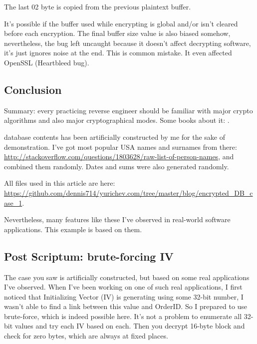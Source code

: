 The last 02 byte is copied from the previous plaintext buffer.

It's possible if the buffer used while encrypting is global and/or isn't cleared before
each encryption.
The final buffer size value is also biased somehow, nevertheless, the bug left uncaught
because it doesn't affect decrypting software, it's just ignores noise at the end.
This is common mistake.
It even affected OpenSSL (Heartbleed bug).

\subsection{Conclusion}

Summary:
every practicing reverse engineer should be familiar with major crypto algorithms and
also major cryptographical modes.
Some books about it: .

 database contents has been artificially constructed by me for the sake of demonstration.
I've got most popular USA names and surnames from there: \url{http://stackoverflow.com/questions/1803628/raw-list-of-person-names},
and combined them randomly.
Dates and sums were also generated randomly.

All files used in this article are here: \url{https://github.com/dennis714/yurichev.com/tree/master/blog/encrypted_DB_case_1}.

Nevertheless, many features like these I've observed in real-world software applications.
This example is based on them.

\subsection{Post Scriptum: brute-forcing IV}

The case you saw is artificially constructed, but based on some real applications I've observed.
When I've been working on one of such real applications, 
I first noticed that Initializing Vector (IV) is generating using some 32-bit number, I wasn't able to find a link between this value and OrderID.
So I prepared to use brute-force, which is indeed possible here.
It's not a problem to enumerate all 32-bit values and try each IV based on each.
Then you decrypt 16-byte block and check for zero bytes, which are always at fixed places.

